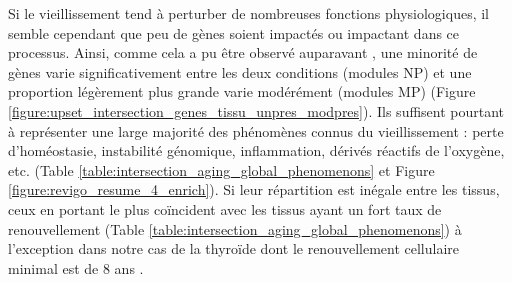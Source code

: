 Si le vieillissement tend à perturber de nombreuses fonctions physiologiques, il semble cependant que peu de gènes soient impactés ou impactant dans ce processus. Ainsi, comme cela a pu être observé auparavant , une minorité de gènes varie significativement entre les deux conditions (modules NP) et une proportion légèrement plus grande varie modérément (modules MP) (Figure \ref{figure:upset_intersection_genes_tissu_unpres_modpres}). 
Ils suffisent pourtant à représenter une large majorité des phénomènes connus du vieillissement : perte d'homéostasie, instabilité génomique, inflammation, dérivés réactifs de l'oxygène, etc. (Table \ref{table:intersection_aging_global_phenomenons} et Figure \ref{figure:revigo_resume_4_enrich}). 
Si leur répartition est inégale entre les tissus, ceux en portant le plus coïncident avec les tissus ayant un fort taux de renouvellement  (Table \ref{table:intersection_aging_global_phenomenons}) à l'exception dans notre cas de la thyroïde dont le renouvellement cellulaire minimal est de 8 ans . 
